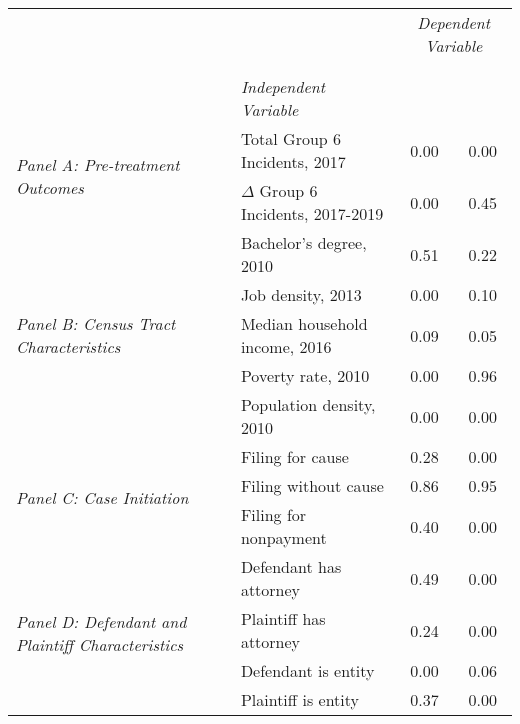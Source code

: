 \begin{tabular}{llcc}
\toprule
 &  & \multicolumn{2}{c}{\textit{Dependent Variable}} \\
\cline{3-4}
\\
 &  &  &  \\
 & \emph{Independent Variable} &  &  \\
\midrule
\multirow[c]{2}{3cm}{\textit{Panel A: Pre-treatment Outcomes}} & Total Group 6 Incidents, 2017 & 0.00 & 0.00 \\
 & $\Delta$ Group 6 Incidents, 2017-2019 & 0.00 & 0.45 \\
\cline{1-4}
\multirow[c]{5}{3cm}{\textit{Panel B: Census Tract Characteristics}} & Bachelor's degree, 2010 & 0.51 & 0.22 \\
 & Job density, 2013 & 0.00 & 0.10 \\
 & Median household income, 2016 & 0.09 & 0.05 \\
 & Poverty rate, 2010 & 0.00 & 0.96 \\
 & Population density, 2010 & 0.00 & 0.00 \\
\cline{1-4}
\multirow[c]{3}{3cm}{\textit{Panel C: Case Initiation}} & Filing for cause & 0.28 & 0.00 \\
 & Filing without cause & 0.86 & 0.95 \\
 & Filing for nonpayment & 0.40 & 0.00 \\
\cline{1-4}
\multirow[c]{4}{3cm}{\textit{Panel D: Defendant and Plaintiff Characteristics}} & Defendant has attorney & 0.49 & 0.00 \\
 & Plaintiff has attorney & 0.24 & 0.00 \\
 & Defendant is entity & 0.00 & 0.06 \\
 & Plaintiff is entity & 0.37 & 0.00 \\
\cline{1-4}
\bottomrule
\end{tabular}
